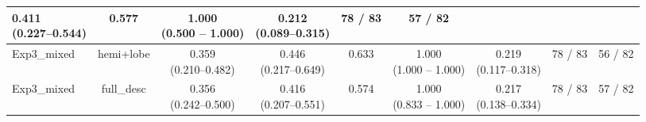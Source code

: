 \documentclass[a4paper,12pt]{article}
\begin{document}
\begin{table}[ht]
\begin{tabular}{lcccccccc}
\makecell{0.411 \\ (0.227--0.544)} &
0.577 &
\makecell{1.000 \\ (0.500 -- 1.000)} &
\makecell{0.212 \\ (0.089--0.315)} &
78 / 83 &
\colorbox{green!20}{57 / 82} \\
\hline
Exp3\_mixed &
hemi+lobe & 
\makecell{\colorbox{blue!20}{0.359} \\ (0.210--0.482)} &
\makecell{\colorbox{green!20}{0.446} \\ (0.217--0.649)} &
\colorbox{green!20}{0.633} &
\makecell{1.000 \\ (1.000 -- 1.000)} &
\makecell{\colorbox{blue!20}{0.219} \\ (0.117--0.318)} &
78 / 83 &
\colorbox{blue!20}{56 / 82} \\
\hline
Exp3\_mixed &
full\_desc &
\makecell{0.356 \\ (0.242--0.500)} &
\makecell{\colorbox{orange!20}{0.416} \\ (0.207--0.551)} &
0.574 &
\makecell{1.000 \\ (0.833 -- 1.000)} &
\makecell{0.217 \\ (0.138--0.334)} &
78 / 83 &
\colorbox{green!20}{57 / 82} \\
\hline
\end{tabular}
\end{table}
\end{document}
